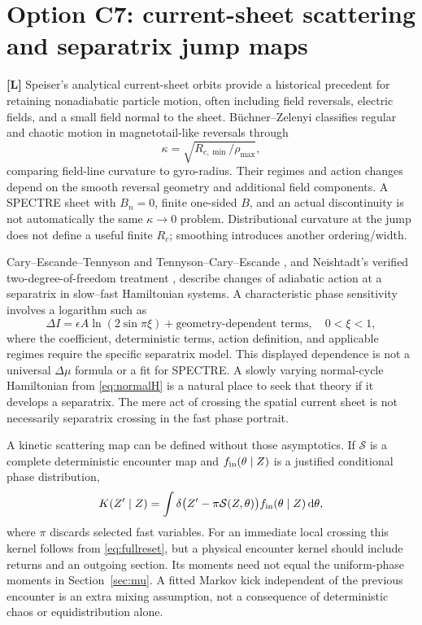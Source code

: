 \documentclass[10pt,a4paper]{article}
\newcommand{\lit}{\textbf{[L]}}
\begin{document}
\section{Option C7: current-sheet scattering and separatrix jump maps}
\label{sec:scatter}
\lit{} Speiser's analytical current-sheet orbits \cite{speiser} provide a historical precedent for retaining nonadiabatic particle motion, often including field reversals, electric fields, and a small field normal to the sheet. B\"uchner--Zelenyi \cite{buchner} classifies regular and chaotic motion in magnetotail-like reversals through
\begin{equation}
 \kappa=\sqrt{R_{c,\min}/\rho_{\max}},
\end{equation}
comparing field-line curvature to gyro-radius. Their regimes and action changes depend on the smooth reversal geometry and additional field components. A SPECTRE sheet with $B_n=0$, finite one-sided $B$, and an actual discontinuity is not automatically the same $\kappa\to0$ problem. Distributional curvature at the jump does not define a useful finite $R_c$; smoothing introduces another ordering/width.

Cary--Escande--Tennyson and Tennyson--Cary--Escande \cite{caryescande,tennyson}, and Neishtadt's verified two-degree-of-freedom treatment \cite{neishtadt87}, describe changes of adiabatic action at a separatrix in slow--fast Hamiltonian systems. A characteristic phase sensitivity involves a logarithm such as
\begin{equation}
 \Delta I=\epsilon A\ln(2\sin\pi\xi)+\text{geometry-dependent terms},
 \quad 0<\xi<1,
\end{equation}
where the coefficient, deterministic terms, action definition, and applicable regimes require the specific separatrix model. This displayed dependence is not a universal $\Delta\mu$ formula or a fit for SPECTRE. A slowly varying normal-cycle Hamiltonian from \eqref{eq:normalH} is a natural place to seek that theory if it develops a separatrix. The mere act of crossing the spatial current sheet is not necessarily separatrix crossing in the fast phase portrait.

A kinetic scattering map can be defined without those asymptotics. If $\mathcal S$ is a complete deterministic encounter map and $f_{\rm in}(\theta\mid Z)$ is a justified conditional phase distribution,
\begin{equation}\label{eq:kernel}
 K(Z'\mid Z)=\int\delta\bigl(Z'-\pi\mathcal S(Z,\theta)\bigr)
                     f_{\rm in}(\theta\mid Z)\,\mathrm d\theta,
\end{equation}
where $\pi$ discards selected fast variables. For an immediate local crossing this kernel follows from \eqref{eq:fullreset}, but a physical encounter kernel should include returns and an outgoing section. Its moments need not equal the uniform-phase moments in Section~\ref{sec:mu}. A fitted Markov kick independent of the previous encounter is an extra mixing assumption, not a consequence of deterministic chaos or equidistribution alone.
\end{document}
